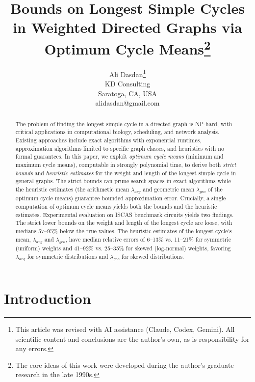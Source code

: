 \documentclass{article}
\theoremstyle{definition}
\begin{document}
\title{Bounds on Longest Simple Cycles in Weighted Directed Graphs via
  Optimum Cycle Means\thanks{The core ideas of this work were
    developed during the author's graduate research in the late
    1990s.}}

\author{Ali Dasdan\thanks{This article was revised with AI assistance (Claude, Codex, Gemini). All scientific content and conclusions are the author's own, as is responsibility for any errors.}\\
  KD Consulting\\
  Saratoga, CA, USA\\
  alidasdan@gmail.com\\
}

\maketitle

\begin{abstract}
The problem of finding the longest simple cycle in a directed graph is
NP-hard, with critical applications in computational biology,
scheduling, and network analysis. Existing approaches include exact
algorithms with exponential runtimes, approximation algorithms limited
to specific graph classes, and heuristics with no formal
guarantees. In this paper, we exploit \textit{optimum cycle means}
(minimum and maximum cycle means), computable in strongly polynomial
time, to derive both \textit{strict bounds} and \textit{heuristic
  estimates} for the weight and length of the longest simple cycle in
general graphs. The strict bounds can prune search spaces in exact
algorithms while the heuristic estimates (the arithmetic mean
$\lambda_{avg}$ and geometric mean $\lambda_{geo}$ of the optimum
cycle means) guarantee bounded approximation error. Crucially, a
single computation of optimum cycle means yields both the bounds and
the heuristic estimates. Experimental evaluation on ISCAS benchmark
circuits yields two findings. The strict lower bounds on the weight
and length of the longest cycle are loose, with medians 57--95\% below
the true values. The heuristic estimates of the longest cycle's mean,
$\lambda_{avg}$ and $\lambda_{geo}$, have median relative errors of
6--13\% vs. 11--21\% for symmetric (uniform) weights and 41--92\%
vs. 25--35\% for skewed (log-normal) weights, favoring $\lambda_{avg}$
for symmetric distributions and $\lambda_{geo}$ for skewed
distributions.
\end{abstract}

\section{Introduction}
\label{sec:intro}
\end{document}

